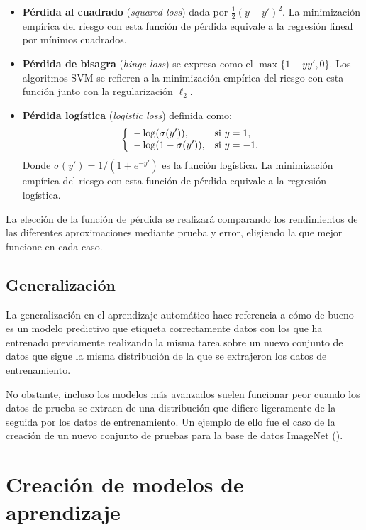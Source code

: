 \documentclass[oneside,openright,titlepage,numbers=noenddot,openany,headinclude,footinclude=true,
cleardoublepage=empty,abstractoff,BCOR=5mm,paper=a4,fontsize=12pt,main=spanish]{scrreprt}
\begin{document}
\begin{itemize}
    \item \textbf{Pérdida al cuadrado} (\textit{squared loss}) dada por $\frac{1}{2}(y-y')^2$. La minimización empírica del riesgo con esta función de pérdida equivale a la regresión lineal por mínimos cuadrados. 
    \item \textbf{Pérdida de bisagra} (\textit{hinge loss}) se expresa como el $\max\{1-yy',0\}$. Los algoritmos SVM se refieren a la minimización empírica del riesgo con esta función junto con la regularización $\ell_2$.
    \clearpage
    \item \textbf{Pérdida logística} (\textit{logistic loss}) definida como: $$\left \{
    \begin{array}{l l}
    -\log(\sigma(y')), & \mbox{si } y=1, \\
    -\log(1-\sigma(y')), & \mbox{si } y=-1.
    \end{array}
    \right.$$
    Donde $\sigma(y')=1/(1+e^{-y'})$ es la función logística. La minimización empírica del riesgo con esta función de pérdida equivale a la regresión logística. 
\end{itemize}

La elección de la función de pérdida se realizará comparando los rendimientos de las diferentes aproximaciones mediante prueba y error, eligiendo la que mejor funcione en cada caso.

\subsection*{Generalización}

La generalización en el aprendizaje automático hace referencia a cómo de bueno es un modelo predictivo que etiqueta correctamente datos con los que ha entrenado previamente realizando la misma tarea sobre un nuevo conjunto de datos que sigue la misma distribución de la que se extrajeron los datos de entrenamiento.

No obstante, incluso los modelos más avanzados suelen funcionar peor cuando los datos de prueba se extraen de una distribución que difiere ligeramente de la seguida por los datos de entrenamiento. Un ejemplo de ello fue el caso de la creación de un nuevo conjunto de pruebas para la base de datos ImageNet (\cite{generalize2019}).

\section{Creación de modelos de aprendizaje}
\end{document}
